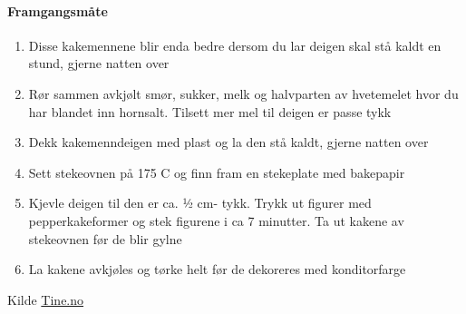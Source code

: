 \paragraph{Framgangsmåte}
\begin{enumerate}[noitemsep]
	\item Disse kakemennene blir enda bedre dersom du lar deigen skal stå kaldt en stund, gjerne natten over
	\item Rør sammen avkjølt smør, sukker, melk og halvparten av hvetemelet hvor du har blandet inn hornsalt. Tilsett mer mel til deigen er passe tykk
	\item Dekk kakemenndeigen med plast og la den stå kaldt, gjerne natten over
	\item Sett stekeovnen på 175 \degree C og finn fram en stekeplate med bakepapir
	\item Kjevle deigen til den er ca. ½ cm- tykk. Trykk ut figurer med pepperkakeformer og stek figurene i ca 7 minutter. Ta ut kakene av stekeovnen før de blir gylne
	\item La kakene avkjøles og tørke helt før de dekoreres med konditorfarge
\end{enumerate}


Kilde \href{http://www.tine.no/oppskrifter/kaker/vafler-og-smakaker/8721.cms?hvite-kakemenn-(og--damer)}{Tine.no}
